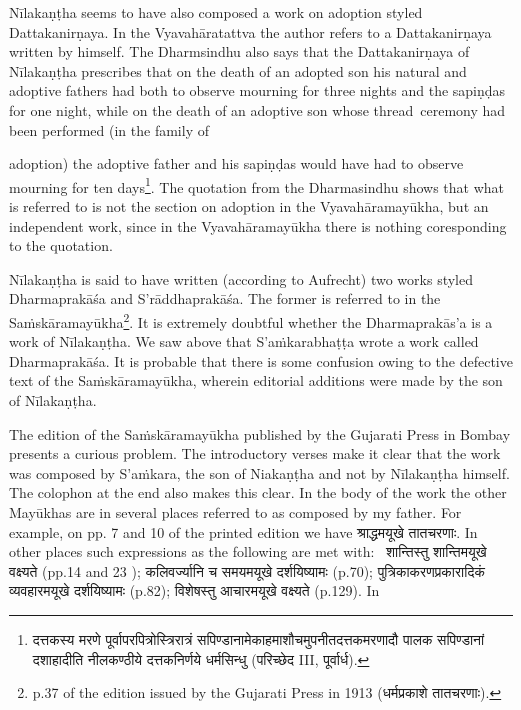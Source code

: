 \documentclass[11pt, openany]{book}
\begin{document}
Nīlakaṇṭha seems to have also composed a work on adoption styled Dattakanirṇaya. In the Vyavahāratattva the author refers to a Dattakanirṇaya written by himself. The Dharmsindhu also says that the Dattakanirṇaya of Nīlakaṇṭha prescribes that on the death of an adopted son his natural and adoptive fathers had both to observe mourning for three nights and the sapiṇḍas for one night, while on the death of an adoptive son whose thread\textendash\ ceremony had been performed (in the family of

\newpage

\noindent
adoption) the adoptive father and his sapiṇḍas would have had to observe mourning for ten days\renewcommand{\thefootnote}{1}\footnote{{\qt दत्तकस्य मरणे पूर्वापरपित्रोस्त्रिरात्रं सपिण्डानामेकाहमाशौचमुपनीतदत्तकमरणादौ पालक सपिण्डानां दशाहादीति नीलकण्ठीये दत्तकनिर्णये} धर्मसिन्धु (परिच्छेद III, पूर्वार्ध).}. The quotation from the Dharmasindhu shows that what is referred to is not the section on adoption in the Vyavahāramayūkha, but an independent work, since in the Vyavahāramayūkha there is nothing coresponding to the quotation.

Nīlakaṇṭha is said to have written (according to Aufrecht) two works styled Dharmaprakāśa and S'rāddhaprakāśa. The former is referred to in the Saṁskāramayūkha\renewcommand{\thefootnote}{2}\footnote{p.37 of the edition issued by the Gujarati Press in 1913 (धर्मप्रकाशे तातचरणाः).}. It is extremely doubtful whether the Dharmaprakās'a is a work of Nīlakaṇṭha. We saw above that S'aṁkarabhaṭṭa wrote a work called Dharmaprakāśa. It is probable that there is some confusion owing to the defective text of the Saṁskāramayūkha, wherein editorial additions were made by the son of Nīlakaṇṭha.

The edition of the Saṁskāramayūkha published by the Gujarati Press in Bombay presents a curious problem. The introductory verses make it clear that the work was composed by S'aṁkara, the son of Niakaṇṭha and not by Nīlakaṇṭha himself. The colophon at the end also makes this clear. In the body of the work the other Mayūkhas are in several places referred to as {\qt composed by my father}. For example, on pp. 7 and 10 of the printed edition we have श्राद्धमयूखे तातचरणाः. In other places such expressions as the following are met with: \textendash\ {\qt शान्तिस्तु शान्तिमयूखे वक्ष्यते} (pp.14 and 23 ); {\qt कलिवर्ज्यानि च समयमयूखे दर्शयिष्यामः} (p.70); {\qt पुत्रिकाकरणप्रकारादिकं व्यवहारमयूखे दर्शयिष्यामः} (p.82); {\qt विशेषस्तु आचारमयूखे वक्ष्यते} (p.129). In
\end{document}
